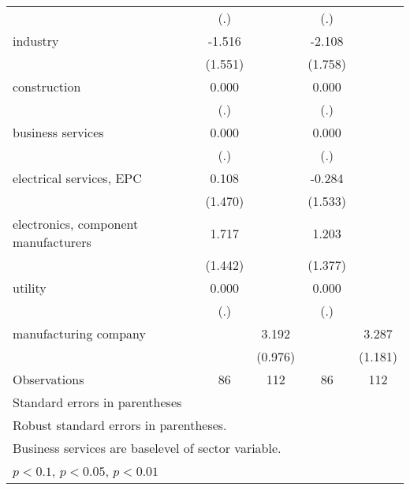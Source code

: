 {\begin{tabular}{l*{4}{c}}
                    &         (.)         &                     &         (.)         &                     \\
[1em]
industry            &      -1.516         &                     &      -2.108         &                     \\
                    &     (1.551)         &                     &     (1.758)         &                     \\
[1em]
construction        &       0.000         &                     &       0.000         &                     \\
                    &         (.)         &                     &         (.)         &                     \\
[1em]
business services   &       0.000         &                     &       0.000         &                     \\
                    &         (.)         &                     &         (.)         &                     \\
[1em]
electrical services, EPC&       0.108         &                     &      -0.284         &                     \\
                    &     (1.470)         &                     &     (1.533)         &                     \\
[1em]
electronics, component manufacturers&       1.717         &                     &       1.203         &                     \\
                    &     (1.442)         &                     &     (1.377)         &                     \\
[1em]
utility             &       0.000         &                     &       0.000         &                     \\
                    &         (.)         &                     &         (.)         &                     \\
[1em]
manufacturing company&                     &       3.192\sym{***}&                     &       3.287\sym{***}\\
                    &                     &     (0.976)         &                     &     (1.181)         \\
\hline
Observations        &          86         &         112         &          86         &         112         \\
\hline\hline
\multicolumn{5}{l}{\footnotesize Standard errors in parentheses}\\
\multicolumn{5}{l}{\footnotesize Robust standard errors in parentheses.}\\
\multicolumn{5}{l}{\footnotesize Business services are baselevel of sector variable.}\\
\multicolumn{5}{l}{\footnotesize \sym{*} \(p<0.1\), \sym{**} \(p<0.05\), \sym{***} \(p<0.01\)}\\
\end{tabular}
}
